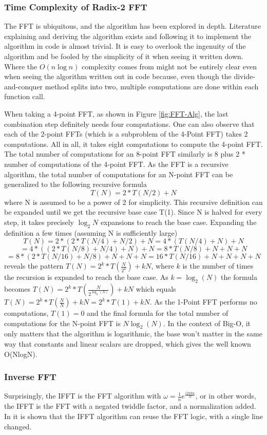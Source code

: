 \subsubsection{Time Complexity of Radix-2 FFT}
The FFT is ubiquitous, and the algorithm has been explored in depth. Literature explaining and deriving the algorithm exists and following it to implement the algorithm in code is almost trivial. It is easy to overlook the ingenuity of the algorithm and be fooled by the simplicity of it when seeing it written down. Where the $O(n\log n)$ complexity comes from might not be entirely clear even when seeing the algorithm written out in code because, even though the divide-and-conquer method splits into two, multiple computations are done within each function call. 

When taking a 4-point FFT, as shown in Figure \ref{fig:FFT-Alg}, the last combination step definitely needs four computations. One can also observe that each of the 2-point FFTs (which is a subproblem of the 4-Point FFT) takes 2 computations. All in all, it takes eight computations to compute the 4-point FFT. The total number of computations for an 8-point FFT similarly is 8 plus 2 * number of computations of the 4-point FFT. As the FFT is a recursive algorithm, the total number of computations for an N-point FFT can be generalized to the following recursive formula
$$T(N) = 2*T(N/2) + N$$
where N is assumed to be a power of 2 for simplicity. This recursive definition can be expanded
until we get the recursive base case T(1). Since N is halved for every step, it takes precisely $\log_2 N$ expansions to reach the base case. Expanding the definition a few times (assuming N is sufficiently large)
$$T(N) = 2*(2*T(N/4) + N/2) + N = 4*(T(N/4) + N) + N$$
$$= 4*((2*T(N/8)+N/4) + N) + N = 8*T(N/8) + N + N + N$$
$$= 8*(2*T(N/16) + N/8) + N + N + N = 16*T(N/16) + N + N + N + N$$
reveals the pattern $T(N) = 2^k*T(\frac{N}{2^k}) + kN$, where $k$ is the number of times the recursion is expanded to reach the base case. As $k =\log_2(N)$ the formula becomes $T(N) = 2^k*T(\frac{N}{2^{\log_2(N)}}) + kN$ which equals $T(N) = 2^k*T(\frac{N}{N}) + kN = 2^k * T(1) + kN$. As the 1-Point FFT performs no computations, $T(1) = 0$ and the final formula for the total number of computations for the N-point FFT is $N \log_2(N)$. In the context of Big-O, it only matters that the algorithm is logarithmic, the base won't matter in the same way that constants and linear scalars are dropped, which gives the well known O(NlogN).

\subsubsection{Inverse FFT}
Surprisingly, the IFFT is the FFT algorithm with $\omega = \frac{1}{n}e^{\frac{i2\pi kn}{N}}$, or in other words, the IFFT is the FFT with a negated twiddle factor, and a normalization added. In \cite{Reducible2020} it is shown that the IFFT algorithm can reuse the FFT logic, with a single line changed. 

